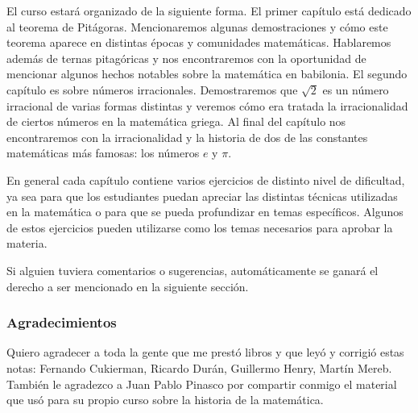 El curso estará organizado de la siguiente forma.  El primer capítulo está
dedicado al teorema de Pitágoras. Mencionaremos algunas demostraciones y cómo
este teorema aparece en distintas épocas y comunidades matemáticas. Hablaremos
además de ternas pitagóricas y nos encontraremos con la oportunidad de
mencionar algunos hechos notables sobre la matemática en babilonia.  El segundo
capítulo es sobre números irracionales. Demostraremos que $\sqrt{2}$ es un
número irracional de varias formas distintas y veremos cómo era tratada la
irracionalidad de ciertos números en la matemática griega. Al final del
capítulo nos encontraremos con la irracionalidad y la historia de dos de las
constantes matemáticas más famosas: los números $e$ y $\pi$. 

En general cada capítulo contiene varios ejercicios de distinto nivel de
dificultad, ya sea para que los estudiantes puedan apreciar las distintas
técnicas utilizadas en la matemática o para que se pueda profundizar en temas
específicos. Algunos de estos ejercicios pueden utilizarse como los temas
necesarios para aprobar la materia. 

Si alguien tuviera comentarios o sugerencias, automáticamente se ganará el
derecho a ser mencionado en la siguiente sección.

\subsubsection*{Agradecimientos}

Quiero agradecer a toda la gente que me prestó libros y que leyó y corrigió
estas notas: Fernando Cukierman, Ricardo Durán, Guillermo Henry, Martín Mereb. También le agradezco a Juan Pablo
Pinasco por compartir conmigo el material que usó para su propio curso sobre la
historia de la matemática. 

